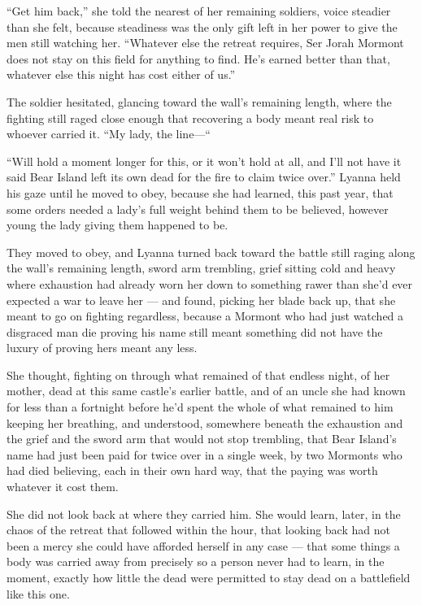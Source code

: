 “Get him back,” she told the nearest of her remaining soldiers, voice steadier than she felt, because steadiness was the only gift left in her power to give the men still watching her. “Whatever else the retreat requires, Ser Jorah Mormont does not stay on this field for anything to find. He’s earned better than that, whatever else this night has cost either of us.”

The soldier hesitated, glancing toward the wall’s remaining length, where the fighting still raged close enough that recovering a body meant real risk to whoever carried it. “My lady, the line—“

“Will hold a moment longer for this, or it won’t hold at all, and I’ll not have it said Bear Island left its own dead for the fire to claim twice over.” Lyanna held his gaze until he moved to obey, because she had learned, this past year, that some orders needed a lady’s full weight behind them to be believed, however young the lady giving them happened to be.

They moved to obey, and Lyanna turned back toward the battle still raging along the wall’s remaining length, sword arm trembling, grief sitting cold and heavy where exhaustion had already worn her down to something rawer than she’d ever expected a war to leave her — and found, picking her blade back up, that she meant to go on fighting regardless, because a Mormont who had just watched a disgraced man die proving his name still meant something did not have the luxury of proving hers meant any less.

She thought, fighting on through what remained of that endless night, of her mother, dead at this same castle’s earlier battle, and of an uncle she had known for less than a fortnight before he’d spent the whole of what remained to him keeping her breathing, and understood, somewhere beneath the exhaustion and the grief and the sword arm that would not stop trembling, that Bear Island’s name had just been paid for twice over in a single week, by two Mormonts who had died believing, each in their own hard way, that the paying was worth whatever it cost them.

She did not look back at where they carried him. She would learn, later, in the chaos of the retreat that followed within the hour, that looking back had not been a mercy she could have afforded herself in any case — that some things a body was carried away from precisely so a person never had to learn, in the moment, exactly how little the dead were permitted to stay dead on a battlefield like this one.
